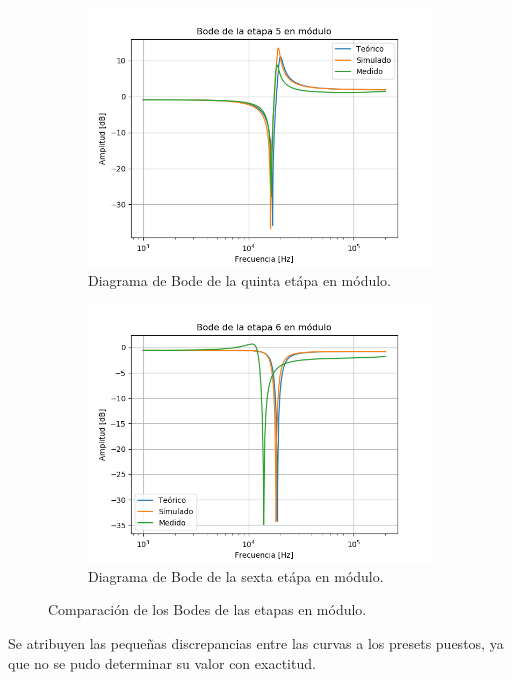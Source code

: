 \begin{figure}[H]
\begin{subfigure}{.49\textwidth}
\centering
	\includegraphics[width=\textwidth]{Imagenes/Mod-5.png}
	\caption{Diagrama de Bode de la quinta etápa en módulo.}
	\label{fig:mod5}
\end{subfigure}
\centering
\begin{subfigure}{.49\textwidth}
\centering
	\includegraphics[width=\textwidth]{Imagenes/Mod-6.png}
	\caption{Diagrama de Bode de la sexta etápa en módulo.}
	\label{fig:mod6}
\end{subfigure}
\caption{Comparación de los Bodes de las etapas en módulo.}
\label{fig:bode-mag}
\end{figure}

Se atribuyen las pequeñas discrepancias entre las curvas a los presets puestos, ya que no se pudo determinar su valor con exactitud.

